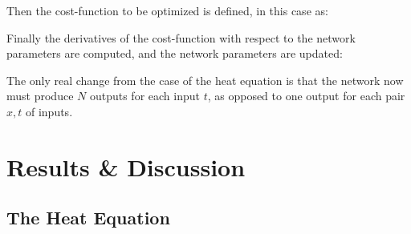 \documentclass[reprint, english, nofootinbib]{revtex4-2}
\begin{document}

Then the cost-function to be optimized is defined, in this case as:


Finally the derivatives of the cost-function with respect to the network parameters are computed, and the network parameters are updated:


The only real change from the case of the heat equation is that the network now must produce $N$ outputs for each input $t$, as opposed to one output for each pair $x,t$ of inputs.


\section{Results \& Discussion}

\subsection{The Heat Equation}
\end{document}

